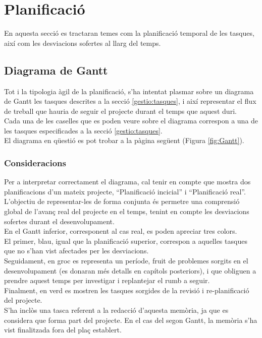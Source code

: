 \section{Planificació}
En aquesta secció es tractaran temes com la planificació temporal de les tasques, així com les desviacions sofertes al llarg del temps.
\subsection{Diagrama de Gantt}
Tot i la tipologia àgil de la planificació, s'ha intentat plasmar sobre un diagrama de Gantt les tasques descrites a la secció \ref{gestio:tasques}, i així representar el flux de treball que hauria de seguir el projecte durant el temps que aquest duri.\\
\newline Cada una de les caselles que es poden veure sobre el diagrama correspon a una de les tasques especificades a la secció \ref{gestio:tasques}.\\
\newline El diagrama en qüestió es pot trobar a la pàgina següent (Figura \ref{fig:Gantt}).\\
\subsubsection{Consideracions}
Per a interpretar correctament el diagrama,  cal tenir en compte que mostra dos planificacions d'un mateix projecte, ``Planificació incicial'' i ``Planificació real''.\\
L'objectiu de representar-les de forma conjunta és permetre una comprensió global de l'avanç real del projecte en el temps, tenint en compte les desviacions sofertes durant el desenvolupament.\\
\newline En el Gantt inferior, corresponent al cas real, es poden apreciar tres colors.\\
El primer, blau, igual que la planificació superior, correspon a aquelles tasques que no s'han vist afectades per les desviacions.\\
Seguidament, en groc es representa un període, fruit de problemes sorgits en el desenvolupament (es donaran més detalls en capítols posteriors), i que obliguen a prendre aquest temps per investigar i replantejar el rumb a seguir.\\
Finalment, en verd es mostren les tasques sorgides de la revisió i re-planificació del projecte.\\
\newline S'ha inclòs una tasca referent a la redacció d'aquesta memòria, ja que es considera que forma part del projecte. En el cas del segon Gantt, la memòria s'ha vist finalitzada fora del plaç establert.

